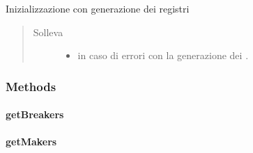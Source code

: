 \documentclass[letterpaper,10pt,italian,openany,oneside]{sphinxmanual}
\begin{document}
\begin{fulllineitems}
\label{\detokenize{source/it/unicam/cs/pa/mastermind/gamecore/GlobalSettings:it.unicam.cs.pa.mastermind.gamecore.GlobalSettings.GlobalSettings()}}
Inizializzazione con generazione dei registri
\begin{quote}\begin{description}
\item[{Solleva}] \leavevmode\begin{itemize}
\item {} 
 \textendash{} in caso di errori con la generazione dei .

\end{itemize}

\end{description}\end{quote}

\end{fulllineitems}



\subsubsection{Methods}
\label{\detokenize{source/it/unicam/cs/pa/mastermind/gamecore/GlobalSettings:methods}}

\paragraph{getBreakers}
\label{\detokenize{source/it/unicam/cs/pa/mastermind/gamecore/GlobalSettings:getbreakers}}

\begin{fulllineitems}
\label{\detokenize{source/it/unicam/cs/pa/mastermind/gamecore/GlobalSettings:it.unicam.cs.pa.mastermind.gamecore.GlobalSettings.getBreakers()}}
\end{fulllineitems}



\paragraph{getMakers}
\label{\detokenize{source/it/unicam/cs/pa/mastermind/gamecore/GlobalSettings:getmakers}}
\end{document}
